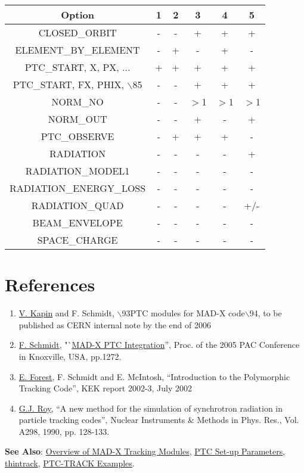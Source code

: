 \begin{tabular}{cccccc}
\hline 
\textbf{Option} & \textbf{1} & \textbf{2} & \textbf{3} & \textbf{4} & \textbf{5 } \\ 
\hline
CLOSED\_ORBIT & - & - & + & + & + \\ 
\hline
ELEMENT\_BY\_ELEMENT & - & + & - & + & - \\ 
\hline
PTC\_START, X, PX, ... & + & + & + & + & + \\ 
\hline
PTC\_START, FX, PHIX, $\backslash$85 & -  & - & + & + & + \\ 
\hline
NORM\_NO & - & - & $>$1 & $>$1 & $>$1 \\ 
\hline
NORM\_OUT & - & - & + & - & + \\ 
\hline
PTC\_OBSERVE & - & + & + & + & - \\ 
\hline
RADIATION & - & - & - & - & + \\ 
\hline
RADIATION\_MODEL1 & - & - & - & - & - \\ 
\hline
RADIATION\_ENERGY\_LOSS & - & - & - & - & - \\ 
\hline
RADIATION\_QUAD & - & - & - & - & +/- \\ 
\hline
BEAM\_ENVELOPE & - & - & - & - & - \\ 
\hline
SPACE\_CHARGE & - & - & - & - & - \\ 
\hline
\end{tabular}



\section{References}
\begin{enumerate} %
   \item \href{V._Kapin}{V. Kapin} and F. Schmidt, $\backslash$93PTC
     modules for MAD-X code$\backslash$94, to be published as CERN
     internal note by the end of 2006 
   \item \href{F._Schmidt}{F. Schmidt},
     "`\href{http://cern.ch/madx/doc/MPPE012.pdf}{MAD-X PTC
     Integration}'', Proc. of the 2005 PAC Conference in Knoxville, USA,
     pp.1272.  
   \item \href{E._Forest}{E. Forest}, F. Schmidt and E. McIntosh,
     ``Introduction to the Polymorphic Tracking Code'', KEK report
     2002-3, July 2002 
   \item \href{G.J._Roy}{G.J. Roy}, ``A new method for the simulation of 
   synchrotron radiation in particle tracking codes'', Nuclear
   Instruments \& Methods in Phys. Res., Vol. A298, 1990, pp. 128-133. 
\end{enumerate}


{\bf See Also}: 
\href{../tracking/tracking.html}{Overview of MAD-X Tracking Modules}, 
\href{../ptc_general/ptc_general.html}{PTC Set-up Parameters}, 
\href{../thintrack/thintrack.html}{thintrack},   
\href{http://cern.ch/frs/mad-X_examples/ptc_track}{PTC-TRACK Examples}. 



